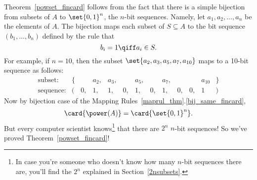 Theorem~\ref{powset_fincard} follows from the fact that there is a
simple bijection from subsets of $A$ to $\set{0,1}^n$, the $n$-bit
sequences.  Namely, let $a_1, a_2, \dots, a_n$ be the elements of $A$.
The bijection maps each subset of $S \subseteq A$ to the bit sequence
$(b_1, \dots, b_n)$ defined by the rule that
\[
b_i = 1 \qiff a_i \in S.
\]
For example, if $n = 10$, then the subset $\set{a_2, a_3, a_5, a_7,
  a_{10}}$ maps to a 10-bit sequence as follows: %
\[
\begin{array}{rrrrrrrrrrrrr}
\text{subset:} & \{ & & a_2, & a_3, & & a_5, & & a_7, & & & a_{10} &
\} \\ \text{sequence:} & ( & 0, & 1, & 1, & 0, & 1, & 0, & 1, & 0, &
0, & 1 & )
\end{array}
\]
Now by bijection case of the Mapping Rules~\ref{maprul_thm}.\eqref{bij_same_fincard},
\[
\card{\power(A)} = \card{\set{0,1}^n}.
\]
But every computer scientist knows\footnote{In case you're someone who
  doesn't know how many $n$-bit sequences there are, you'll find the
  $2^n$ explained in Section~\ref{2nsubsets}.}
  that there are $2^n$ $n$-bit sequences!  So we've proved
  Theorem~\ref{powset_fincard}!

\begin{problems}
\classproblems
{}

\end{problems}

\endinput
